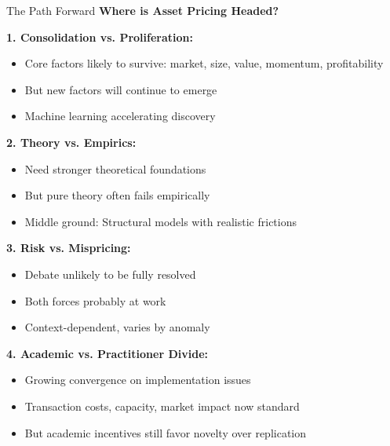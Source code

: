 \documentclass{beamer}
\begin{document}
\begin{frame}[allowframebreaks]{The Path Forward}
    \textbf{Where is Asset Pricing Headed?}
    
    
    \textbf{1. Consolidation vs. Proliferation:}
    \begin{itemize}
        \item Core factors likely to survive: market, size, value, momentum, profitability
        \item But new factors will continue to emerge
        \item Machine learning accelerating discovery
    \end{itemize}
    
    
    \textbf{2. Theory vs. Empirics:}
    \begin{itemize}
        \item Need stronger theoretical foundations
        \item But pure theory often fails empirically
        \item Middle ground: Structural models with realistic frictions
    \end{itemize}
    
    
    \textbf{3. Risk vs. Mispricing:}
    \begin{itemize}
        \item Debate unlikely to be fully resolved
        \item Both forces probably at work
        \item Context-dependent, varies by anomaly
    \end{itemize}
    
    
    \textbf{4. Academic vs. Practitioner Divide:}
    \begin{itemize}
        \item Growing convergence on implementation issues
        \item Transaction costs, capacity, market impact now standard
        \item But academic incentives still favor novelty over replication
    \end{itemize}
\end{frame}
\end{document}
